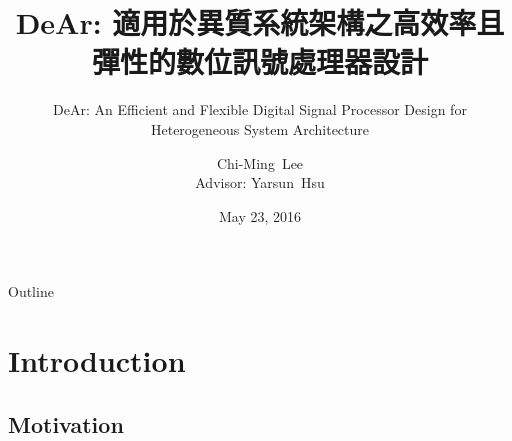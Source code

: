 \documentclass{beamer}
\author[Chi-Ming~Lee]{ 
    Chi-Ming~Lee\\{\small Advisor: Yarsun~Hsu}
}
\institute[NTHU EE] %
{
    Department of Electrial Engineering\\
    National Tsing Hua University
}
\date{May 23, 2016}
\begin{document}
\begin{CJK}{UTF8}{bkai}

    \title[DeAr DSP]{ DeAr: 適用於異質系統架構之高效率且彈性的數位訊號處理器設計}
    \subtitle{DeAr: An Efficient and Flexible Digital Signal Processor Design for Heterogeneous System Architecture}

    \begin{frame}
        \titlepage
    \end{frame}

    \begin{frame}{Outline}
        \tableofcontents
    \end{frame}


    \section{Introduction}

    \subsection{Motivation}


\end{CJK}
\end{document}
